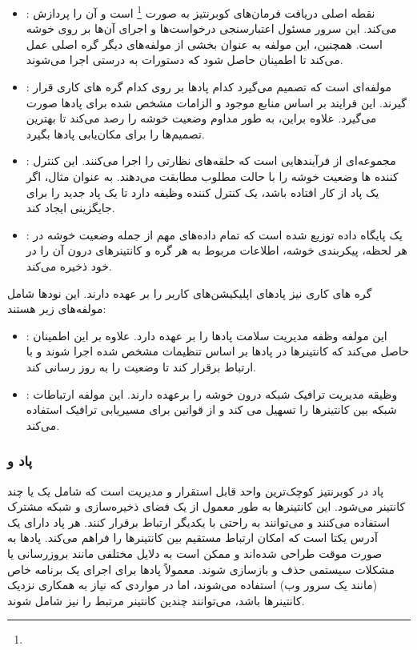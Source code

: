 \begin{itemize}
	\item 
{}: 
نقطه اصلی دریافت فرمان‌های کوبرنتیز به صورت \footnote{} است و آن را پردازش می‌کند. این سرور مسئول اعتبارسنجی درخواست‌ها و اجرای آن‌ها بر روی خوشه است. همچنین، این مولفه به عنوان بخشی از مولفه‌های دیگر گره اصلی عمل می‌کند تا اطمینان حاصل شود که دستورات به درستی اجرا می‌شوند.
	\item 
{}: 
مولفه‌ای است که تصمیم می‌گیرد کدام پادها بر روی کدام گره های کاری قرار گیرند. این فرایند بر اساس منابع موجود و الزامات مشخص شده برای پادها صورت می‌گیرد. علاوه براین، به طور مداوم وضعیت خوشه را رصد می‌کند تا بهترین تصمیم‌ها را برای مکان‌یابی پادها بگیرد.
	\item 
{}:
مجموعه‌ای از فرآیند‌هایی است که حلقه‌های نظارتی را اجرا می‌کنند. این کنترل کننده ها وضعیت خوشه را با حالت مطلوب مطابقت می‌دهند. به عنوان مثال، اگر یک پاد از کار افتاده باشد، یک کنترل کننده وظیفه دارد تا یک پاد جدید را برای جایگزینی ایجاد کند.
	\item 
{}: 
یک پایگاه داده توزیع شده است که تمام داده‌های مهم از جمله وضعیت خوشه در هر لحظه، پیکربندی خوشه، اطلاعات مربوط به هر گره و کانتینرهای درون آن را در خود ذخیره می‌کند. 
\end{itemize}

گره های کاری نیز پادهای اپلیکیشن‌های کاربر را بر عهده دارند. این نودها شامل مولفه‌های زیر هستند:
\begin{itemize}
	\item 
{}:
 این مولفه وظفه مدیریت سلامت پادها را بر عهده دارد. علاوه بر این اطمینان حاصل می‌کند که کانتینرها در پادها بر اساس تنظیمات مشخص شده اجرا شوند و با  ارتباط برقرار کند تا وضعیت را به روز رسانی کند.
 	\item
{}: 
 وظیقه مدیریت ترافیک شبکه درون خوشه را برعهده دارند. این مولفه ارتباطات شبکه بین کانتینرها را تسهیل می کند و از قوانین  برای مسیریابی ترافیک استفاده می‌کند.
\end{itemize}


\subsubsection{پاد و }
پاد در کوبرنتیز کوچک‌ترین واحد قابل استقرار و مدیریت است که شامل یک یا چند کانتینر می‌شود. این کانتینرها به طور معمول از یک فضای ذخیره‌سازی و شبکه مشترک استفاده می‌کنند و می‌توانند به راحتی با یکدیگر ارتباط برقرار کنند. هر پاد دارای یک آدرس  یکتا است که امکان ارتباط مستقیم بین کانتینرها را فراهم می‌کند. پادها به صورت موقت طراحی شده‌اند و ممکن است به دلایل مختلفی مانند بروزرسانی یا مشکلات سیستمی حذف و بازسازی شوند. معمولاً پادها برای اجرای یک برنامه خاص (مانند یک سرور وب) استفاده می‌شوند، اما در مواردی که نیاز به همکاری نزدیک کانتینرها باشد، می‌توانند چندین کانتینر مرتبط را نیز شامل شوند.

